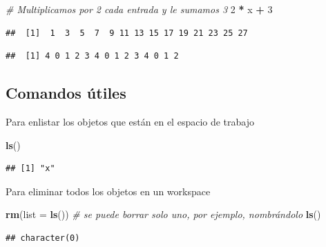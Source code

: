 \documentclass[]{article}
\newenvironment{Shaded}{\begin{snugshade}}{\end{snugshade}}
\newcommand{\KeywordTok}[1]{\textcolor[rgb]{0.13,0.29,0.53}{\textbf{#1}}}
\newcommand{\DataTypeTok}[1]{\textcolor[rgb]{0.13,0.29,0.53}{#1}}
\newcommand{\DecValTok}[1]{\textcolor[rgb]{0.00,0.00,0.81}{#1}}
\newcommand{\StringTok}[1]{\textcolor[rgb]{0.31,0.60,0.02}{#1}}
\newcommand{\CommentTok}[1]{\textcolor[rgb]{0.56,0.35,0.01}{\textit{#1}}}
\newcommand{\OperatorTok}[1]{\textcolor[rgb]{0.81,0.36,0.00}{\textbf{#1}}}
\newcommand{\NormalTok}[1]{#1}
\begin{document}
\begin{Shaded}
\begin{Highlighting}[]
\CommentTok{# Multiplicamos por 2 cada entrada y le sumamos 3}
\DecValTok{2} \OperatorTok{*}\StringTok{ }\NormalTok{x }\OperatorTok{+}\StringTok{ }\DecValTok{3}
\end{Highlighting}
\end{Shaded}

\begin{verbatim}
##  [1]  1  3  5  7  9 11 13 15 17 19 21 23 25 27
\end{verbatim}

\begin{Shaded}
\end{Shaded}

\begin{verbatim}
##  [1] 4 0 1 2 3 4 0 1 2 3 4 0 1 2
\end{verbatim}

\subsection{Comandos útiles}\label{comandos-utiles}

Para enlistar los objetos que están en el espacio de trabajo

\begin{Shaded}
\begin{Highlighting}[]
\KeywordTok{ls}\NormalTok{()}
\end{Highlighting}
\end{Shaded}

\begin{verbatim}
## [1] "x"
\end{verbatim}

Para eliminar todos los objetos en un workspace

\begin{Shaded}
\begin{Highlighting}[]
\KeywordTok{rm}\NormalTok{(}\DataTypeTok{list =} \KeywordTok{ls}\NormalTok{()) }\CommentTok{# se puede borrar solo uno, por ejemplo, nombrándolo}
\KeywordTok{ls}\NormalTok{()}
\end{Highlighting}
\end{Shaded}

\begin{verbatim}
## character(0)
\end{verbatim}
\end{document}
